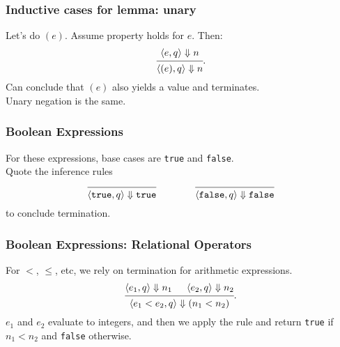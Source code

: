 \documentclass{beamer}
\newenvironment{changemargin}[1]{%
  \begin{list}{}{%
    \setlength{\topsep}{0pt}%
    \setlength{\leftmargin}{#1}%
    \setlength{\rightmargin}{1em}
    \setlength{\listparindent}{\parindent}%
    \setlength{\itemindent}{\parindent}%
    \setlength{\parsep}{\parskip}%
  }%
  \item[]}{\end{list}}
\begin{document}
\begin{frame}
  \frametitle{Inductive cases for lemma: unary}
  \begin{changemargin}{2em}
    Let's do $(e)$. Assume property holds for $e$. Then:
\[
  \begin{prooftree}
    \hypo{\langle e, q \rangle \Downarrow n}
  \infer1{\langle (e), q \rangle \Downarrow n},
  \end{prooftree}
.
\]
Can conclude that $(e)$ also yields a value and terminates.\\
Unary negation is the same.
  \end{changemargin}
\end{frame}

\begin{frame}
  \frametitle{Boolean Expressions}
  \Large
  \begin{changemargin}{2em}
    For these expressions, base cases are \texttt{true} and \texttt{false}.\\[1em]
    Quote the inference
rules
\[
\begin{array}{ccc}
  \begin{prooftree}
  \infer0{\langle \texttt{true}, q \rangle \Downarrow \texttt{true}},
\end{prooftree} & \hspace*{2em} &
\begin{prooftree}
  \infer0{\langle \texttt{false}, q \rangle \Downarrow \texttt{false}}
\end{prooftree}
\end{array}
\]
to conclude termination.

  \end{changemargin}
\end{frame}

\begin{frame}
  \frametitle{Boolean Expressions: Relational Operators}
  \Large
  \begin{changemargin}{2em}
    For $<$, $\le$, etc, we rely on termination for arithmetic expressions.
\[
  \begin{prooftree}
    \hypo{\langle e_1, q \rangle \Downarrow n_1}
    \hypo{\langle e_2, q \rangle \Downarrow n_2}
  \infer2{\langle e_1 < e_2, q \rangle \Downarrow (n_1 < n_2)}
  \end{prooftree}
  .
\]
$e_1$ and $e_2$ evaluate to integers, and then we apply the rule and return
\texttt{true} if $n_1 < n_2$ and \texttt{false} otherwise.
  \end{changemargin}
\end{frame}
\end{document}

